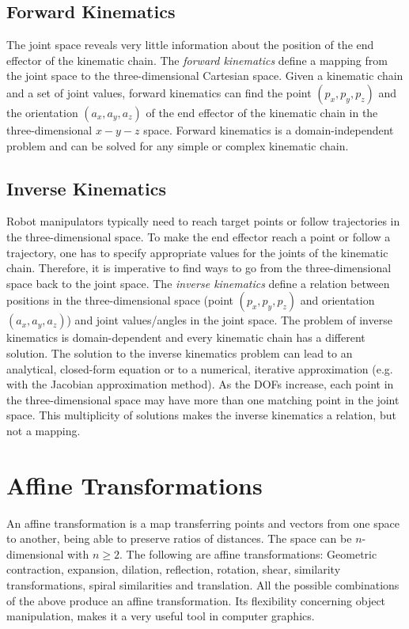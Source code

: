 \subsection{Forward Kinematics}
The joint space reveals very little information about the position of the end effector of the kinematic chain. The \textit{forward kinematics} define a mapping from the joint space to the three-dimensional Cartesian space. Given a kinematic chain and a set of joint values, forward kinematics can find the point \((p_x,p_y,p_z)\) and the orientation \((a_x,a_y,a_z)\) of the end effector of the kinematic chain in the three-dimensional $x-y-z$ space. Forward kinematics is a domain-independent problem and can be solved for any simple or complex kinematic chain.

\subsection{Inverse Kinematics}
Robot manipulators typically need to reach target points or follow trajectories in the three-dimensional space. To make the end effector reach a point or follow a trajectory, one has to specify appropriate values for the joints of the kinematic chain. Therefore, it is imperative to find ways to go from the three-dimensional space back to the joint space. The \textit{inverse kinematics} define a relation between positions in the three-dimensional space (point \((p_x,p_y,p_z)\) and orientation \((a_x,a_y,a_z)\)) and joint values/angles in the joint space. The problem of inverse kinematics is domain-dependent and every kinematic chain has a different solution. The solution to the inverse kinematics problem can lead to an analytical, closed-form equation or to a numerical, iterative approximation (e.g. with the Jacobian approximation method). As the DOFs increase, each point in the three-dimensional space may have more than one matching point in the joint space. This multiplicity of solutions makes the inverse kinematics a relation, but not a mapping.




\section{Affine Transformations}
An affine transformation is a map transferring points and vectors from one space to another, being able to preserve ratios of distances. The space can be \(n\)-dimensional with \(n\ge2\). The following are affine transformations: Geometric contraction, expansion, dilation, reflection, rotation, shear, similarity transformations, spiral similarities and translation. All the possible combinations of the above produce an affine transformation. Its flexibility concerning object manipulation, makes it a very useful tool in computer graphics.

